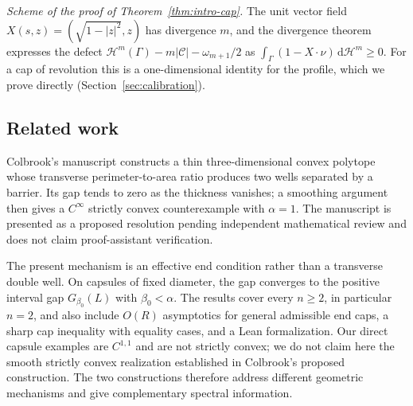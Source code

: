 \documentclass[11pt,a4paper]{article}
\numberwithin{equation}{section}
\theoremstyle{paperplain}
\theoremstyle{remark}
\newcommand{\C}{\mathcal{C}}
\newcommand{\HH}{\mathcal{H}}
\newcommand{\dd}{\,\mathrm d}
\begin{document}
\emph{Scheme of the proof of Theorem~\ref{thm:intro-cap}.} The unit vector
field $X(s,z)=(\sqrt{1-|z|^2},z)$ has divergence $m$, and the divergence
theorem expresses the defect $\HH^m(\Gamma)-m|\C|-\omega_{m+1}/2$ as
$\int_\Gamma(1-X\cdot\nu)\dd\HH^m\ge0$. For a cap of revolution this is a
one-dimensional identity for the profile, which we prove directly
(Section~\ref{sec:calibration}).

\subsection{Related work}

Colbrook's manuscript \cite{Colbrook} constructs a thin three-dimensional
convex polytope whose transverse perimeter-to-area ratio produces two
wells separated by a barrier. Its gap tends to zero as the thickness
vanishes; a smoothing argument then gives a $C^\infty$ strictly convex
counterexample with $\alpha=1$. The manuscript is presented as a proposed
resolution pending independent mathematical review and does not claim
proof-assistant verification.

The present mechanism is an effective end condition rather than a
transverse double well. On capsules of fixed diameter, the gap converges
to the positive interval gap $G_{\beta_0}(L)$ with $\beta_0<\alpha$.
The results cover every $n\ge2$, in particular $n=2$, and also include
$O(R)$ asymptotics for general admissible end caps, a sharp cap inequality
with equality cases, and a Lean formalization. Our direct capsule examples
are $C^{1,1}$ and are not strictly convex; we do not claim here the smooth
strictly convex realization established in Colbrook's proposed construction.
The two constructions therefore address different geometric mechanisms
and give complementary spectral information.
\end{document}
